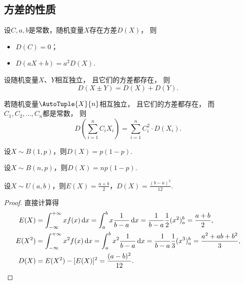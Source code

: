 \subsection{方差的性质}
\begin{property}\label{theorem:随机变量的数字特征.方差的性质1}
设\(C,a,b\)是常数，随机变量\(X\)存在方差\(D(X)\)，
则\begin{itemize}
	\item \(D(C) = 0\)；
	\item \(D(aX+b) = a^2 D(X)\).
\end{itemize}
\end{property}

\begin{property}\label{theorem:随机变量的数字特征.方差的性质2}
设随机变量\(X\)、\(Y\)相互独立，
且它们的方差都存在，
则\[
	D(X \pm Y) = D(X) + D(Y).
\]
\end{property}

\begin{corollary}\label{theorem:随机变量的数字特征.方差的性质3}
若随机变量\(\AutoTuple{X}{n}\)相互独立，
且它们的方差都存在，
而\(C_1,C_2,\dotsc,C_n\)都是常数，
则\[
	D\left( \sum_{i=1}^n C_i X_i \right)
	= \sum_{i=1}^n C_i^2 \cdot D(X_i).
\]
\end{corollary}

\begin{theorem}
设\(X \sim B(1,p)\)，则\(D(X) = p(1-p)\).
\end{theorem}

\begin{theorem}%
设\(X \sim B(n,p)\)，则\(D(X) = np(1-p)\).
\end{theorem}

\begin{theorem}%
设\(X \sim U(a,b)\)，则\(E(X) = \frac{a+b}{2}\)，\(D(X) = \frac{(b-a)^2}{12}\).
\begin{proof}
直接计算得
\begin{align*}
E(X) &= \int_{-\infty}^{+\infty} x f(x) \dd{x}
= \int_a^b x \frac{1}{b-a} \dd{x}
= \frac{1}{b-a} \frac{1}{2} (x^2)_a^b
= \frac{a+b}{2}, \\
E(X^2) &= \int_{-\infty}^{+\infty} x^2 f(x) \dd{x}
= \int_a^b x^2 \frac{1}{b-a} \dd{x}
= \frac{1}{b-a} \frac{1}{3} (x^3)_a^b
= \frac{a^2+ab+b^2}{3}, \\
D(X) &= E(X^2) - [E(X)]^2
= \frac{(a-b)^2}{12}.
\qedhere
\end{align*}
\end{proof}
\end{theorem}

